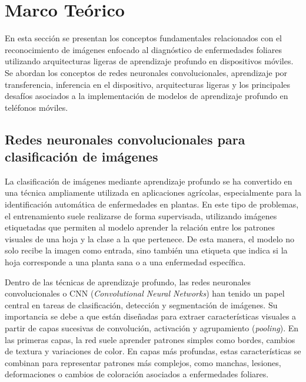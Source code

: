 \chapter{Marco Teórico}

En esta sección se presentan los conceptos fundamentales relacionados con el reconocimiento de imágenes enfocado al
diagnóstico de enfermedades foliares utilizando arquitecturas ligeras de aprendizaje profundo en dispositivos móviles.
Se abordan los conceptos de redes neuronales convolucionales, aprendizaje por transferencia, inferencia en el dispositivo,
arquitecturas ligeras y los principales desafíos asociados a la implementación de modelos de aprendizaje profundo en teléfonos
móviles.


\section{Redes neuronales convolucionales para clasificación de imágenes}

La clasificación de imágenes mediante aprendizaje profundo se ha convertido en una técnica ampliamente utilizada en aplicaciones
agrícolas, especialmente para la identificación automática de enfermedades en plantas. En este tipo de problemas, el entrenamiento suele
realizarse de forma supervisada, utilizando imágenes etiquetadas que permiten al modelo aprender la relación entre los patrones visuales
de una hoja y la clase a la que pertenece. De esta manera, el modelo no solo recibe la imagen como entrada, sino también una etiqueta que
indica si la hoja corresponde a una planta sana o a una enfermedad específica.

Dentro de las técnicas de aprendizaje profundo, las redes neuronales convolucionales o CNN (\textit{Convolutional Neural Networks}) han
tenido un papel central en tareas de clasificación, detección y segmentación de imágenes. Su importancia se debe a que están diseñadas
para extraer características visuales a partir de capas sucesivas de convolución, activación y agrupamiento (\textit{pooling}). En las
primeras capas, la red suele aprender patrones simples como bordes, cambios de textura y variaciones de color. En capas más profundas,
estas características se combinan para representar patrones más complejos, como manchas, lesiones, deformaciones o cambios de coloración
asociados a enfermedades foliares.


